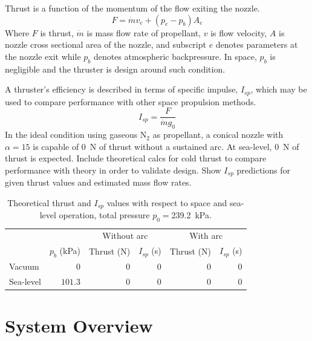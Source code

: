 \documentclass[journal]{IEEEtran}
\begin{document}
Thrust is a function of the momentum of the flow exiting the nozzle.
\begin{equation}
\label{eq:thrust}
  F=\dot{m}v_e + (p_e-p_b)A_e
\end{equation}
 Where $F$ is thrust, $\dot{m}$ is mass flow rate of propellant, $v$ is flow velocity, $A$ is nozzle cross sectional area of the nozzle, and subscript $e$ denotes parameters at the nozzle exit while $p_b$ denotes atmospheric backpressure.
 In space, $p_b$ is negligible and the thruster is design around such condition.

 A thruster's efficiency is described in terms of specific impulse, $I_{sp}$, which may be used to compare performance with other space propulsion methods.
 \begin{equation}
 \label{eq:isp}
   I_{sp}=\frac{F}{\dot{m} g_0}
 \end{equation}
In the ideal condition using gaseous N$_2$ as propellant, a conical nozzle with $\alpha=15$ is capable of {\color{red}\SI{0}{\newton} of thrust} without a sustained arc.
At sea-level, {\color{red}\SI{0}{\newton} of thrust} is expected.
{\color{red}Include theoretical calcs for cold thrust to compare performance with theory in order to validate design.
Show $I_{sp}$ predictions for given thrust values and estimated mass flow rates.}

\begin{table}[hbp]
  \caption{Theoretical thrust and $I_{sp}$ values with respect to space and sea-level operation, total pressure $p_0= $\SI{239.2}{\kilo\pascal}.
\label{tab:theoretical-performance}
}
{\color{red}
  \begin{tabular}{lrrrrr}
    \toprule
    & & \multicolumn{2}{c}{Without arc} & \multicolumn{2}{c}{With arc} \\
    & $p_b$ (\si{\kilo\pascal}) & Thrust (\si{\newton}) & $I_{sp}$ (\si{\second}) & Thrust (\si{\newton}) & $I_{sp}$ (\si{\second}) \\
    \midrule
    Vacuum    & $0$     & $0$ & $0$ & $0$ & $0$ \\
    Sea-level & $101.3$ & $0$ & $0$ & $0$ & $0$ \\
    \bottomrule
  \end{tabular}
  }
\end{table}

\section{System Overview}
\end{document}
